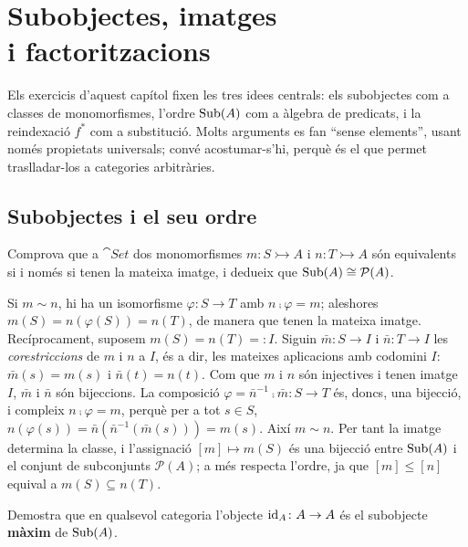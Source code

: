 \chapter[Subobjectes, imatges i factoritzacions]{\texorpdfstring{Subobjectes, imatges\\ i factoritzacions}{Subobjectes, imatges i factoritzacions}}

Els exercicis d'aquest capítol fixen les tres idees centrals: els subobjectes com a classes de monomorfismes, l'ordre $\operatorname{Sub}(A)$ com a àlgebra de predicats, i la reindexació $f^{*}$ com a substitució. Molts arguments es fan \enquote{sense elements}, usant només propietats universals; convé acostumar-s'hi, perquè és el que permet traslladar-los a categories arbitràries.

\section{Subobjectes i el seu ordre}

\begin{exercici}
Comprova que a $\cat{Set}$ dos monomorfismes $m\colon S\rightarrowtail A$ i $n\colon T\rightarrowtail A$ són equivalents si i només si tenen la mateixa imatge, i dedueix que $\operatorname{Sub}(A)\cong\mathcal{P}(A)$.
\end{exercici}

\begin{solucio}
Si $m\sim n$, hi ha un isomorfisme $\varphi\colon S\to T$ amb $n\comp\varphi=m$; aleshores $m(S)=n(\varphi(S))=n(T)$, de manera que tenen la mateixa imatge. Recíprocament, suposem $m(S)=n(T)=:I$. Siguin $\bar m\colon S\to I$ i $\bar n\colon T\to I$ les \emph{corestriccions} de $m$ i $n$ a $I$, és a dir, les mateixes aplicacions amb codomini $I$: $\bar m(s)=m(s)$ i $\bar n(t)=n(t)$. Com que $m$ i $n$ són injectives i tenen imatge $I$, $\bar m$ i $\bar n$ són bijeccions. La composició $\varphi=\bar n^{-1}\comp\bar m\colon S\to T$ és, doncs, una bijecció, i compleix $n\comp\varphi=m$, perquè per a tot $s\in S$, $n(\varphi(s))=\bar n(\bar n^{-1}(\bar m(s)))=m(s)$. Així $m\sim n$. Per tant la imatge determina la classe, i l'assignació $[m]\mapsto m(S)$ és una bijecció entre $\operatorname{Sub}(A)$ i el conjunt de subconjunts $\mathcal{P}(A)$; a més respecta l'ordre, ja que $[m]\leq[n]$ equival a $m(S)\subseteq n(T)$.
\end{solucio}

\begin{exercici}
Demostra que en qualsevol categoria l'objecte $\operatorname{id}_A\colon A\to A$ és el subobjecte \textbf{màxim} de $\operatorname{Sub}(A)$.
\end{exercici}

